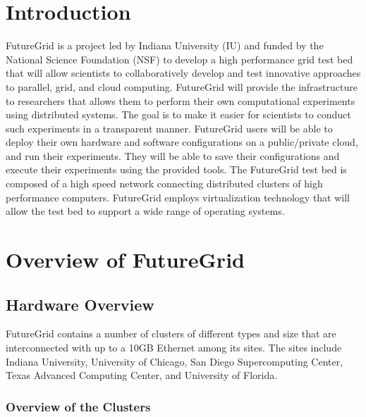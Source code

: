 \documentclass[graybox]{svmult}
\begin{document}
\abstract*{\ABSTRACT}

\abstract{\ABSTRACT}




\section{Introduction}

FutureGrid \cite{las2010gce,las12fg-bookchapter} is a project led by Indiana University (IU) and funded by the National Science Foundation (NSF) to develop a high performance grid test bed that will allow scientists to collaboratively develop and test innovative approaches to parallel, grid, and cloud computing. FutureGrid will provide the infrastructure to researchers that allows them to perform their own computational experiments using distributed systems. The goal is to make it easier for scientists to conduct such experiments in a transparent manner.  FutureGrid users will be able to deploy their own hardware and software configurations on a public/private cloud, and run their experiments. They will be able to save their configurations and execute their experiments using the provided tools. The FutureGrid test bed is composed of a high speed network connecting distributed clusters of high performance computers. FutureGrid employs virtualization technology that will allow the test bed to support a wide range of operating systems.





\section{Overview of FutureGrid}\label{S:overview}

\subsection{Hardware Overview}

FutureGrid contains a number of clusters of different types and size that are interconnected with up to a 10GB Ethernet among its sites. The sites include Indiana University, University of Chicago, San Diego Supercomputing Center, Texas Advanced Computing Center, and University of Florida.

\subsubsection{Overview of the Clusters}\label{S:hw-cluster} 
\end{document}
